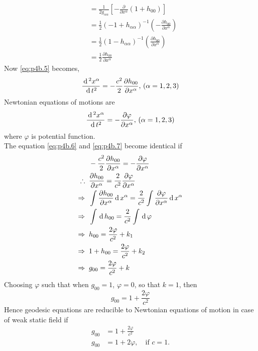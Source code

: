 \documentclass[../main-sheet.tex]{subfiles}
\begin{document}
\begin{soln}
\begin{align*}
                &=\frac{1}{2g_{\alpha\alpha}}\left[-\frac{\partial}{\partial x^\alpha}\left(1+h_{00}\right)\right]\\
                &=\frac{1}{2} (-1+h_{\alpha\alpha})^{-1}\left(-\frac{\partial h_{00}}{\partial x^\alpha}\right)\\
                &=\frac{1}{2} (1-h_{\alpha\alpha})^{-1}\left(\frac{\partial h_{00}}{\partial x^\alpha}\right)\\
                &=\frac{1}{2}\frac{\partial h_{00}}{\partial x^\alpha}
            \end{align*}
            Now \eqref{eq:p4b.5} becomes,
            \begin{equation}
                \frac{\,\mathrm{d}\,^2 x^\alpha}{\,\mathrm{d}\, t^2}= -\frac{c^2}{2}\frac{\partial h_{00}}{\partial x^\alpha},\,(\alpha=1,2,3)
                \label{eq:p4b.6}
            \end{equation}
            Newtonian equations of motions are
            \begin{equation}
                \frac{\,\mathrm{d}\,^2 x^\alpha}{\,\mathrm{d}\, t^2}=-\frac{\partial \varphi}{\partial x^\alpha},\,(\alpha=1,2,3)
                \label{eq:p4b.7}
            \end{equation}
            where \(\varphi\) is potential function.\\
            The equation \eqref{eq:p4b.6} and \eqref{eq:p4b.7} become identical if
            \begin{align*}
                & -\frac{c^2}{2}\frac{\partial h_{00}}{\partial x^\alpha}=-\frac{\partial \varphi}{\partial x^\alpha}\\
                \therefore\;\;& \frac{\partial h_{00}}{\partial x^\alpha}=\frac{2}{c^2}\frac{\partial \varphi}{\partial x^\alpha}\\
                \Rightarrow\;\;& \int\frac{\partial h_{00}}{\partial x^\alpha}\,\mathrm{d}\, x^\alpha=\frac{2}{c^2}\int\frac{\partial \varphi}{\partial x^\alpha}\,\mathrm{d}\, x^\alpha\\
                \Rightarrow\;\;& \int\,\mathrm{d}\, h_{00}=\frac{2}{c^2}\int\,\mathrm{d}\, \varphi\\
                \Rightarrow\;\;& h_{00}=\frac{2\varphi}{c^2}+k_1\\
                \Rightarrow\;\;& 1+h_{00}=\frac{2\varphi}{c^2}+k_2\\
                \Rightarrow\;\;& g_{00}=\frac{2\varphi}{c^2}+k
            \end{align*}
            Choosing \(\varphi\) such that when \(g_{00}=1\), \(\varphi=0\), so that \(k=1\), then
            \[g_{00}=1+\frac{2\varphi}{c^2}\]
            Hence geodesic equations are reducible to Newtonian equations of motion in case of weak static field if
            \begin{align*}
                g_{00}&=1+\frac{2\varphi}{c^2}\\
                g_{00}&=1+2\varphi,\quad \text{if  }c=1.
            \end{align*}
        \end{soln}
\end{document}
